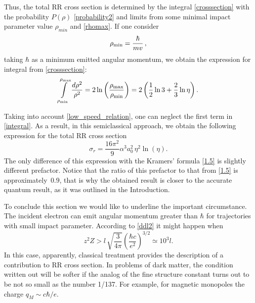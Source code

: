\documentclass{SovJurn/JETPL}
\begin{document}
\par Thus, the total RR cross section is determined by the integral \eqref{crosssection} with the probability $P(\rho)$ \eqref{probability2} and limits from some minimal impact parameter value $\rho_{min}$ and \eqref{rhomax}. If one consider
\begin{equation}
\rho_{\rm min}=\frac{\hbar}{mv}\,,
\label{rhomin}
\end{equation}
taking $\hbar$ as a minimum emitted angular momentum, we obtain the expression for integral from \eqref{crosssection}:
\begin{equation}
\int\limits_{\rho_{\rm min}}^{\rho_{\rm max}}\frac{d\rho^2}{\rho^2}=
2\ln\left(\frac{\rho_{\rm max}}{\rho_{\rm min}}\right)=
2\left(\frac{1}{2}\ln 3+\frac{2}{3}\ln\eta\right).
\label{integral}
\end{equation}
\par Taking into account \eqref{low_speed_relation}, one can neglect the first term in \eqref{integral}. As a result, in this semiclassical approach, we obtain the following expression for the total RR cross section
\begin{equation}
\sigma_r=\frac{16\pi^2}{9}\alpha^3a_0^2\, \eta^2\ln (\eta).
\label{final_sigma}
\end{equation}
The only difference of this expression with the Kramers' formula \eqref{1.5} is slightly different prefactor. Notice that the ratio of this prefactor to that from \eqref{1.5} is approximately~$0.9$, that is why the obtained result is closer to the accurate quantum result, as it was outlined in the Introduction.

\par To conclude this section we would like to underline the important circumstance. The incident electron can emit angular momentum greater than $\hbar$ for trajectories with small impact parameter. According to \eqref{ddl2} it might happen when
\begin{equation}
z^2Z>l\, \sqrt{\frac{3}{4\pi}} \left(\frac{\hbar c}{e^2}\right)^{3/2}\simeq 10^3 l.
\label{final}
\end{equation}
In this case, apparently, classical treatment provides the description of a contribution to RR cross section. In problems of dark matter, the condition written out will be softer if the analog of the fine structure constant turns out to be not so small as the number 1/137. For example, for magnetic monopoles the charge $q_M\sim c\hbar/e$.
\end{document}
